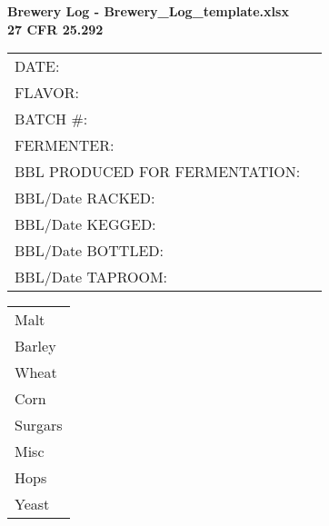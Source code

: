 \documentclass[12pt]{article}
\begin{document}
\noindent\textbf{Brewery Log - Brewery\_Log\_template.xlsx}\\
\textbf{27 CFR 25.292}

\vspace{0.5cm}

\begin{tabular}{ll}
DATE: & \hrulefill \\
FLAVOR: & \hrulefill \\
BATCH \#: & \hrulefill \\
FERMENTER: & \hrulefill \\
BBL PRODUCED FOR FERMENTATION: & \hrulefill \\
BBL/Date RACKED: & \hrulefill \\
BBL/Date KEGGED: & \hrulefill \\
BBL/Date BOTTLED: & \hrulefill \\
BBL/Date TAPROOM: & \hrulefill \\
\end{tabular}

\vspace{0.5cm}

\noindent{}

\vspace{0.2cm}

\begin{tabular}{l}
Malt \hrulefill \\
Barley \hrulefill \\
Wheat \hrulefill \\
Corn \hrulefill \\
Surgars \hrulefill \\
Misc \hrulefill \\
Hops \hrulefill \\
Yeast \hrulefill \\
\end{tabular}

\vspace{0.5cm}

\noindent{}

\vspace{0.2cm}
\end{document}
